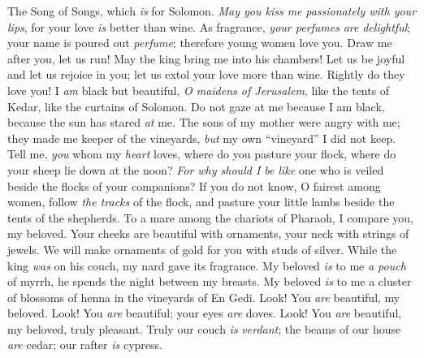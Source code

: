 
\begin{biblechapter} %
 The Song of Songs, which \textit{is} for Solomon.
 \textit{May you kiss me} \textit{passionately with your lips}, 
for your love \textit{is} better than wine.
\verse As fragrance, \textit{your perfumes} \textit{are} \textit{delightful}; 
your name is poured out \textit{perfume}; 
therefore young women love you.
\verse Draw me after you, let us run! 
May the king bring me into his chambers! 
Let us be joyful and let us rejoice in you; 
let us extol your love more than wine. 
Rightly do they love you!
 I \textit{am} black but beautiful, \textit{O maidens of Jerusalem}, 
like the tents of Kedar, like the curtains of Solomon.
\verse Do not gaze at me because I am black,  
because the sun has stared \textit{at} me. 
The sons of my mother were angry with me; 
they made me keeper of the vineyards, 
\textit{but} my own “vineyard” I did not keep.
 Tell me, \textit{you} whom my \textit{heart} loves, 
where do you pasture your flock, 
where do your sheep lie down at the noon? 
\textit{For why should I be like} one who is veiled 
beside the flocks of your companions?
\verse If you do not know, O fairest among women, 
follow \textit{the tracks} of the flock, 
and pasture your little lambs beside the tents of the shepherds.
 To a mare among the chariots of Pharaoh, 
I compare you, my beloved.
\verse Your cheeks are beautiful with ornaments, 
your neck with strings of jewels.
\verse We will make ornaments of gold for you 
with studs of silver.
 While the king \textit{was} on his couch, 
my nard gave its fragrance.
\verse My beloved \textit{is} to me \textit{a pouch} of myrrh, 
he spends the night between my breasts.
\verse My beloved \textit{is} to me a cluster of blossoms of henna 
in the vineyards of En Gedi.
 Look! You \textit{are} beautiful, my beloved. 
Look! You \textit{are} beautiful; 
your eyes \textit{are} doves.
\verse Look! You \textit{are} beautiful, my beloved, 
truly pleasant. 
Truly our couch \textit{is} \textit{verdant};
\verse the beams of our house \textit{are} cedar; 
our rafter \textit{is} cypress.
\end{biblechapter}

